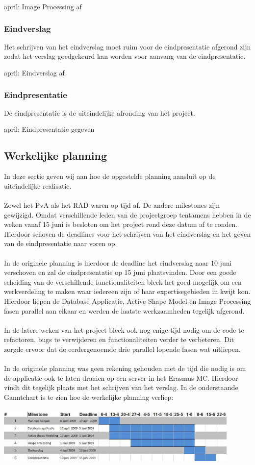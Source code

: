  april: Image Processing af

\subsubsection{Eindverslag}
Het schrijven van het eindverslag moet ruim voor de eindpresentatie afgerond
zijn zodat het verslag goedgekeurd kan worden voor aanvang van de eindpresentatie.

 april: Eindverslag af

\subsubsection{Eindpresentatie}
De eindpresentatie is de uiteindelijke afronding van het project.

 april: Eindpresentatie gegeven

\subsection{Werkelijke planning}
\label{werkelijke_planning}
In deze sectie geven wij aan hoe de opgestelde planning aansluit op de
uiteindelijke realisatie.
\\
\\
Zowel het PvA als het RAD waren op tijd af. De andere milestones zijn
gewijzigd. Omdat verschillende leden van de projectgroep tentamens
hebben in de weken vanaf 15 juni is besloten om het project rond deze datum af
te ronden. Hierdoor schoven de deadlines voor het schrijven van het eindverslag
en het geven van de eindpresentatie naar voren op.
\\
\\
In de originele planning is hierdoor de deadline het eindverslag naar 10 juni verschoven en zal de eindpresentatie op 15 juni plaatsvinden.
Door een goede scheiding van de verschillende functionaliteiten bleek het goed mogelijk om een werkverdeling te maken waar iedereen zijn of haar expertisegebieden in kwijt kon.
Hierdoor liepen de Database Applicatie, Active Shape Model en Image Processing fasen parallel aan elkaar en werden de laatste werkzaamheden tegelijk afgerond.
\\
\\
In de latere weken van het project bleek ook nog enige tijd nodig om de code te
refactoren, bugs te verwijderen en functionaliteiten verder te verbeteren. Dit
zorgde ervoor dat de eerdergenoemde drie parallel lopende fasen wat uitliepen.
\\
\\
In de originele planning was geen rekening gehouden met de tijd die nodig is om
de applicatie ook te laten draaien op een server in het Erasmus MC. Hierdoor
vindt dit tegelijk plaats met het schrijven van het verslag.
In de onderstaande Ganntchart is te zien hoe de werkelijke planning verliep:
\\
\\
\includegraphics[width=0.9\textwidth]{ganntafter}
